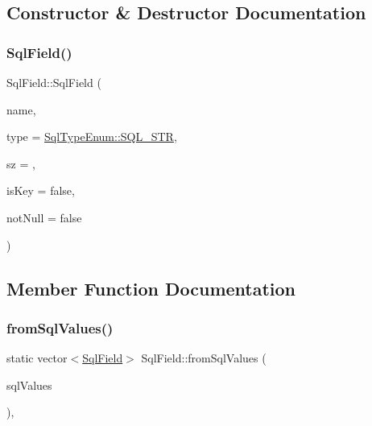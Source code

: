\subsection{Constructor \& Destructor Documentation}
\mbox{\label{structSqlField_af348c54a252bf9ae67e7f280737aa5d0}} 
\subsubsection{\texorpdfstring{Sql\+Field()}{SqlField()}}
{\footnotesize\ttfamily Sql\+Field\+::\+Sql\+Field (\begin{DoxyParamCaption}\item[{const char $\ast$}]{name,  }\item[{const \mbox{\hyperlink{datadefinition_8h_ad06ef517a8bb3398f146f81f18988b9f}{Sql\+Type\+Enum}} \&}]{type = {\ttfamily \mbox{\hyperlink{datadefinition_8h_ad06ef517a8bb3398f146f81f18988b9faa5ec7b1f6f558b362f5a9ced5f228c2b}{Sql\+Type\+Enum\+::\+S\+Q\+L\+\_\+\+S\+TR}}},  }\item[{const int \&}]{sz = {},  }\item[{const bool \&}]{is\+Key = {\ttfamily false},  }\item[{const bool \&}]{not\+Null = {\ttfamily false} }\end{DoxyParamCaption})\hspace{0.3cm}{\ttfamily [inline]}}



\subsection{Member Function Documentation}
\mbox{\label{structSqlField_a4349ebac0f3a6ddbbd81fdb3fbc268f0}} 
\subsubsection{\texorpdfstring{from\+Sql\+Values()}{fromSqlValues()}}
{\footnotesize\ttfamily static vector$<$\mbox{\hyperlink{structSqlField}{Sql\+Field}}$>$ Sql\+Field\+::from\+Sql\+Values (\begin{DoxyParamCaption}\item[{const vector$<$ \mbox{\hyperlink{structSqlValue}{Sql\+Value}} $>$ \&}]{sql\+Values }\end{DoxyParamCaption})\hspace{0.3cm}{\ttfamily [inline]}, {\ttfamily [static]}}



